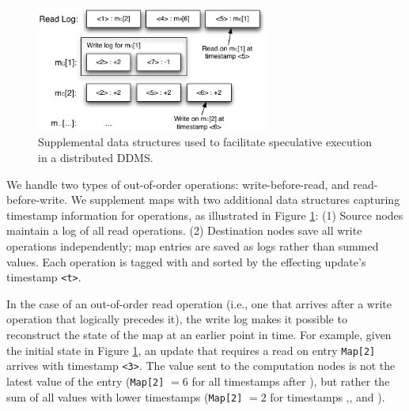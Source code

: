 
\begin{figure}
\begin{center}
\includegraphics[width=3.0in]{graphics/speculative_storage}
\end{center}
\caption{Supplemental data structures used to facilitate speculative execution in a distributed DDMS.}
\label{fig:speculativeStorage}
\vspace{-3mm}
\end{figure}

We handle two types of out-of-order operations: write-before-read, and
read-before-write.  We supplement maps with two additional data structures
capturing timestamp information for operations, as illustrated in Figure
\ref{fig:speculativeStorage}: (1) Source nodes maintain a log of all read
operations.  (2) Destination nodes save all write operations independently; map
entries are saved as logs rather than summed values.  Each operation is tagged
with and sorted by the effecting update's timestamp \texttt{<t>}.

In the case of an out-of-order read operation (i.e., one that arrives after a
write operation that logically precedes it), the write log makes it possible to
reconstruct the state of the map at an earlier point in time.
For example, given the initial state in Figure \ref{fig:speculativeStorage}, an
update that requires a read on entry \texttt{Map[2]} arrives with timestamp
\texttt{<3>}.  The value sent to the computation nodes is not the latest value
of the entry ({\tt Map[2]} $ = 6$ for all timestamps after {\tt <6>}), but
rather the sum of all values with lower timestamps ({\tt Map[2]} $ = 2$ for
timestamps {\tt <3>},{\tt <4>}, and {\tt <5>}).

